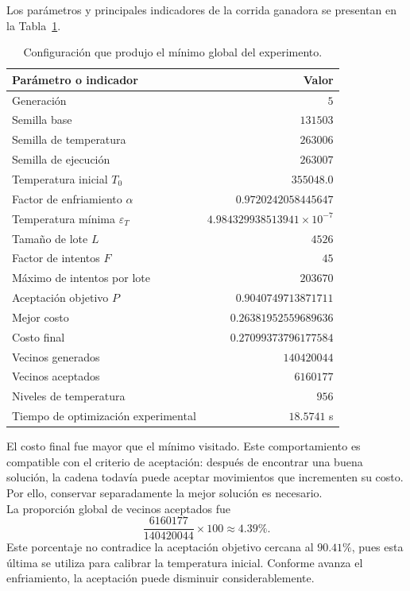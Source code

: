 \documentclass[12pt]{article}
\begin{document}
Los parámetros y principales indicadores de la corrida ganadora se
presentan en la Tabla~\ref{tab:mejor-corrida40}.
\begin{table}[htbp]
    \centering
    \small
    \begin{tabular}{lr}
        \hline
        Parámetro o indicador & Valor \\
        \hline
        Generación & $5$ \\
        Semilla base & $131503$ \\
        Semilla de temperatura & $263006$ \\
        Semilla de ejecución & $263007$ \\
        Temperatura inicial $T_0$ & $355048.0$ \\
        Factor de enfriamiento $\alpha$ & $0.9720242058445647$ \\
        Temperatura mínima $\varepsilon_T$ & $4.984329938513941\times10^{-7}$ \\
        Tamaño de lote $L$ & $4526$ \\
        Factor de intentos $F$ & $45$ \\
        Máximo de intentos por lote & $203670$ \\
        Aceptación objetivo $P$ & $0.9040749713871711$ \\
        Mejor costo & $0.26381952559689636$ \\
        Costo final & $0.27099373796177584$ \\
        Vecinos generados & $140420044$ \\
        Vecinos aceptados & $6160177$ \\
        Niveles de temperatura & $956$ \\
        Tiempo de optimización experimental & $18.5741$ s \\
        \hline
    \end{tabular}
    \caption{Configuración que produjo el mínimo global del experimento.}
    \label{tab:mejor-corrida40}
\end{table}
El costo final fue mayor que el mínimo visitado. Este comportamiento
es compatible con el criterio de aceptación: después de encontrar
una buena solución, la cadena todavía puede aceptar movimientos que
incrementen su costo. Por ello, conservar separadamente la mejor
solución es necesario.
\\
La proporción global de vecinos aceptados fue
\[
    \frac{6160177}{140420044}\times100
    \approx 4.39\%.
\]
Este porcentaje no contradice la aceptación objetivo cercana al
$90.41\%$, pues esta última se utiliza para calibrar la temperatura
inicial. Conforme avanza el enfriamiento, la aceptación puede
disminuir considerablemente.
\end{document}
